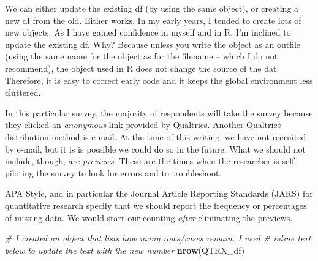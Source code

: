 \documentclass[
  11pt,
]{book}
\newenvironment{Shaded}{\begin{snugshade}}{\end{snugshade}}
\newcommand{\CommentTok}[1]{\textcolor[rgb]{0.37,0.37,0.37}{\textit{#1}}}
\newcommand{\FunctionTok}[1]{\textcolor[rgb]{0.27,0.27,0.27}{\textbf{#1}}}
\newcommand{\NormalTok}[1]{#1}
\newcommand{\OtherTok}[1]{\textcolor[rgb]{0.37,0.37,0.37}{#1}}
\newcommand{\SpecialCharTok}[1]{\textcolor[rgb]{0.43,0.43,0.43}{\textbf{#1}}}
\newcommand{\StringTok}[1]{\textcolor[rgb]{0.5,0.5,0.5}{#1}}
\begin{document}
We can either update the existing df (by using the same object), or creating a new df from the old. Either works. In my early years, I tended to create lots of new objects. As I have gained confidence in myself and in R, I'm inclined to update the existing df. Why? Because unless you write the object as an outfile (using the same name for the object as for the filename -- which I do not recommend), the object used in R does not change the source of the dat. Therefore, it is easy to correct early code and it keeps the global environment less cluttered.

In this particular survey, the majority of respondents will take the survey because they clicked an \emph{anonymous} link provided by Qualtrics. Another Qualtrics distribution method is e-mail. At the time of this writing, we have not recruited by e-mail, but it is is possible we could do so in the future. What we should not include, though, are \emph{previews}. These are the times when the researcher is self-piloting the survey to look for errors and to troubleshoot.

\begin{Shaded}
\end{Shaded}

APA Style, and in particular the Journal Article Reporting Standards (JARS) for quantitative research specify that we should report the frequency or percentages of missing data. We would start our counting \emph{after} eliminating the previews.

\begin{Shaded}
\begin{Highlighting}[]
\CommentTok{\# I created an object that lists how many rows/cases remain.  I used}
\CommentTok{\# inline text below to update the text with the new number}
\FunctionTok{nrow}\NormalTok{(QTRX\_df)}
\end{Highlighting}
\end{Shaded}
\end{document}
